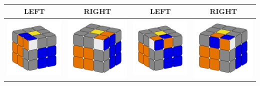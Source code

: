 \documentclass[12pt, a3paper]{article}
\newcommand{\scale}{1}
\begin{document}
\pagestyle{empty}

\begin{center}
	\begin{longtable}{c|c||c|c}
	\Large{LEFT} & \Large{RIGHT} & \Large{LEFT} & \Large{RIGHT}\vspace{1ex}\\
	\hline
	\includegraphics[scale=\scale]{1l} & \includegraphics[scale=\scale]{1r}  &  \includegraphics[scale=\scale]{2l} & \includegraphics[scale=\scale]{2r} \\

\end{longtable}
\end{center}
\end{document}
